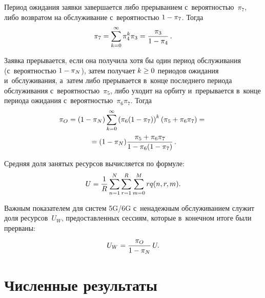 \begin{multicols}{2}
Период ожидания заявки завершается либо прерыванием с~ве\-ро\-ят\-ностью~$\pi_7$, либо 
возвратом на обслуживание с~ве\-ро\-ят\-ностью $1\hm-\pi_7$. \mbox{Тогда}
\begin{equation*}
\pi_7=\sum\limits_{k=0}^{\infty} \pi_4^k \pi_3 = \displaystyle\frac{\displaystyle \pi_3\mathstrut}{\displaystyle 1-\pi_4\mathstrut}\,.
\end{equation*}

Заявка прерывается, если она получила хотя бы один период обслуживания 
(с~ве\-ро\-ят\-ностью $1\hm-\pi_N$), затем получает $k \hm\geq 0$ периодов ожидания 
и~обслуживания, а~затем либо прерывается в~конце по\-след\-не\-го периода обслуживания 
с~ве\-ро\-ят\-ностью~$\pi_5$, либо уходит на орбиту и~прерывается в~конце периода 
ожидания с~ве\-ро\-ят\-ностью~$\pi_6 \pi_7$. \mbox{Тогда}
\begin{multline*} 
    \pi_O= (1  - \pi_N) \sum\limits_{k=0}^{\infty} \left( 
\pi_6 (1-\pi_7)\right)^k (\pi_5 + \pi_6 \pi_7) = {}\\
{}=(1-\pi_N) \displaystyle\frac{\displaystyle \pi_5 + \pi_6 
\pi_7\mathstrut}{\displaystyle 1-\pi_6(1-\pi_7)\mathstrut}\,.
\end{multline*}

Средняя доля занятых ресурсов вы\-чис\-ля\-ет\-ся по фор\-муле:
\begin{equation*} 
U=\displaystyle\frac{\displaystyle 1\mathstrut}{\displaystyle R\mathstrut} \sum\limits_{n=1}^N \sum\limits_{r=1}^R \sum\limits_{m=0}^M r q(n,r,m).
\end{equation*}

Важным показателем для систем 5G/6G с~ненадежным обслуживанием служит доля 
ресурсов~$U_W$, пред\-остав\-лен\-ных сессиям, которые в~конечном итоге были прерваны:
\begin{equation*} 
U_W=\displaystyle\frac{\displaystyle \pi_O\mathstrut}{\displaystyle 1-\pi_N\mathstrut}\, U.
\end{equation*}


\section{Численные результаты}




\end{multicols}
